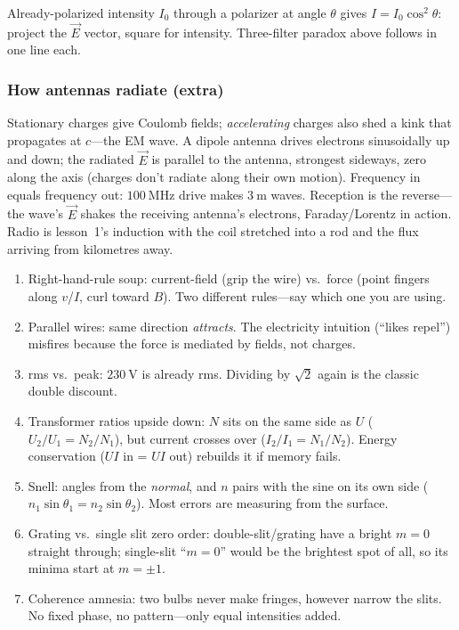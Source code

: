 \begin{remark}\label{rmk:malus}
Already-polarized intensity $I_0$ through a polarizer at angle $\theta$ gives $I = I_0\cos^2\theta$: project the $\vec{E}$ vector, square for intensity. Three-filter paradox above follows in one line each.
\end{remark}

\subsubsection{How antennas radiate (extra)}\label{sec:antenna}

Stationary charges give Coulomb fields; \emph{accelerating} charges also shed a kink that propagates at $c$---the EM wave. A dipole antenna drives electrons sinusoidally up and down; the radiated $\vec{E}$ is parallel to the antenna, strongest sideways, zero along the axis (charges don't radiate along their own motion). Frequency in equals frequency out: $100\ \mathrm{MHz}$ drive makes $3\ \mathrm{m}$ waves. Reception is the reverse---the wave's $\vec{E}$ shakes the receiving antenna's electrons, Faraday/Lorentz in action. Radio is lesson~1's induction with the coil stretched into a rod and the flux arriving from kilometres away.

\begin{remark}\label{rmk:mistakes2}
\begin{enumerate}[label=\alph*)]
  \item Right-hand-rule soup: current-field (grip the wire) vs.\ force (point fingers along $v$/$I$, curl toward $B$). Two different rules---say which one you are using.
  \item Parallel wires: same direction \emph{attracts}. The electricity intuition (``likes repel'') misfires because the force is mediated by fields, not charges.
  \item rms vs.\ peak: $230\ \mathrm{V}$ is already rms. Dividing by $\sqrt{2}$ again is the classic double discount.
  \item Transformer ratios upside down: $N$ sits on the same side as $U$ ($U_2/U_1 = N_2/N_1$), but current crosses over ($I_2/I_1 = N_1/N_2$). Energy conservation ($UI$ in = $UI$ out) rebuilds it if memory fails.
  \item Snell: angles from the \emph{normal}, and $n$ pairs with the sine on its own side ($n_1\sin\theta_1 = n_2\sin\theta_2$). Most errors are measuring from the surface.
  \item Grating vs.\ single slit zero order: double-slit/grating have a bright $m = 0$ straight through; single-slit ``$m = 0$'' would be the brightest spot of all, so its minima start at $m = \pm 1$.
  \item Coherence amnesia: two bulbs never make fringes, however narrow the slits. No fixed phase, no pattern---only equal intensities added.
\end{enumerate}
\end{remark}

